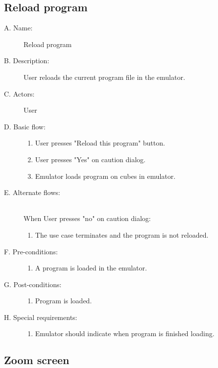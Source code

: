 \documentclass[12pt]{article}
\begin{document}
  \subsection{Reload program}

    \begin{description}
      \item[A. Name:] Reload program
      \item[B. Description:] User reloads the current program file in the emulator.
      \item[C. Actors:] User
      \item[D. Basic flow:] \hfill
        \begin{enumerate}
	  \item{User presses "Reload this program" button.}
	  \item{User presses "Yes" on caution dialog.}
	  \item{Emulator loads program on cubes in emulator.}
        \end{enumerate}
      \item[E. Alternate flows:] \hfill \\
	When User presses "no" on caution dialog:
        \begin{enumerate}
          \item{The use case terminates and the program is not reloaded.}
        \end{enumerate}
      \item[F. Pre-conditions:] \hfill
        \begin{enumerate}
	  \item{A program is loaded in the emulator.}
        \end{enumerate}
      \item[G. Post-conditions:] \hfill
        \begin{enumerate}
	  \item{Program is loaded.}
        \end{enumerate}
      \item[H. Special requirements:] \hfill
        \begin{enumerate}
	  \item{Emulator should indicate when program is finished loading.}
        \end{enumerate}
    \end{description}

  \subsection{Zoom screen}
\end{document}
